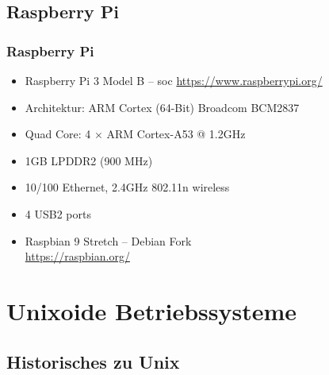 \documentclass[xcolor=dvipsnames,aspectratio=169]{beamer}
\begin{document}
\subsection{Raspberry Pi}
\begin{frame}
	\frametitle{Raspberry Pi}
\begin{itemize}
	\item Raspberry Pi 3 Model B -- \ac{soc} \url{https://www.raspberrypi.org/}
	\item Architektur: ARM Cortex (64-Bit) Broadcom BCM2837
	\item Quad Core: 4 $\times$ ARM Cortex-A53 @ 1.2GHz
	\item 1GB LPDDR2 (900 MHz)
	\item 10/100 Ethernet, 2.4GHz 802.11n wireless
	\item 4 USB2 ports
	\item Raspbian 9 Stretch -- Debian Fork \\ \url{https://raspbian.org/}
\end{itemize}
\end{frame}

\section{Unixoide Betriebssysteme}
\subsection{Historisches zu Unix}
\end{document}
